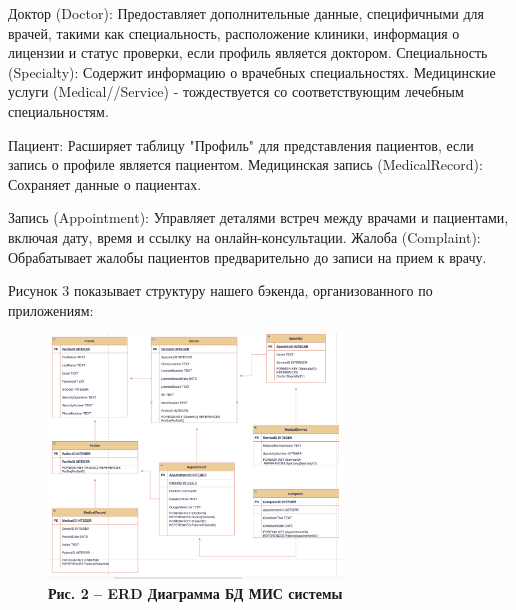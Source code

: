 \begin{multicols}{2}
Доктор (Doctor): Предоставляет дополнительные данные, специфичными для
врачей, такими как специальность, расположение клиники, информация о
лицензии и статус проверки, если профиль является доктором.
Специальность (Specialty): Содержит информацию о врачебных
специальностях. Медицинские услуги (Medical//Service) - тождествуется со
соответствующим лечебным специальностям.

Пациент: Расширяет таблицу "Профиль" для представления пациентов, если
запись о профиле является пациентом. Медицинская запись (MedicalRecord):
Сохраняет данные о пациентах.

Запись (Appointment): Управляет деталями встреч между врачами и
пациентами, включая дату, время и ссылку на онлайн-консультации. Жалоба
(Complaint): Обрабатывает жалобы пациентов предварительно до записи на
прием к врачу.

Рисунок 3 показывает структуру нашего бэкенда, организованного по
приложениям:
\end{multicols}


\begin{figure}[]
	\centering
	\includegraphics[width=0.7\textwidth]{assets/152}
	\caption*{\bfseries Рис. 2 -- ERD Диаграмма БД МИС системы}
\end{figure}

